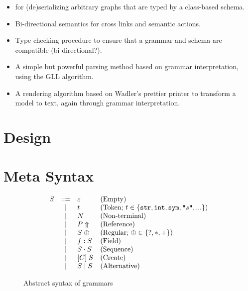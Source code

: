 \documentclass[preprint,10pt]{sigplanconf}
\begin{document}
\begin{itemize}
\item \ensogrammars for (de)serializing arbitrary graphs that
  are typed by a class-based schema.
\item Bi-directional semantics for cross links and semantic actions.
\item Type checking procedure to ensure that a grammar and schema are
  compatible (bi-directional?).
\item A simple but powerful parsing method based on grammar
  interpretation, using the GLL algorithm.
\item A rendering algorithm based on Wadler's prettier printer to
  transform a model to text, again through grammar interpretation.
\end{itemize}

\section{Design}



\section{Meta Syntax}

\def\literal#1{\ensuremath{\text{\texttt{"}}#1\text{\texttt{"}}}}

\begin{figure}
\[
\begin{array}{rcll}
S & ::= & \varepsilon & \text{(Empty)} \\
  & \mid & t & \text{(Token; } t\in\{\text{\texttt{str}}, \text{\texttt{int}}, \text{\texttt{sym}}, \literal{s},... \}\text{)} \\
  & \mid & N & \text{(Non-terminal)}\\
  & \mid & P\Uparrow & \text{(Reference)}\\
  & \mid & S\;\oplus & \text{(Regular; }\oplus\in\{?,*,+\}\text{)}\\ 
  & \mid & f:S & \text{(Field)}\\
  & \mid & S\cdot S & \text{(Sequence)}\\
  & \mid & [C]\; S & \text{(Create)}\\
  & \mid & S \mid S & \text{(Alternative)}\\
\end{array}
\]
\caption{Abstract syntax of \enso grammars\label{FIG:metasyntax}}
\end{figure}
\end{document}
